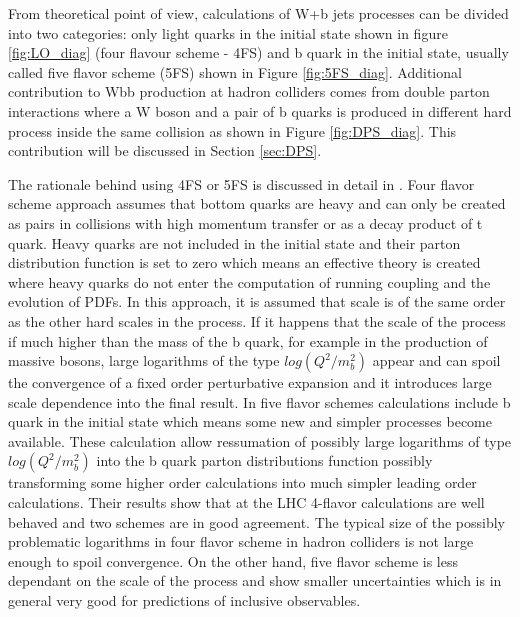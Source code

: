 From theoretical point of view, calculations of W+b jets processes can be divided into two categories: only light quarks in the initial state shown in figure \ref{fig:LO_diag} (four flavour scheme - 4FS) and b quark in the initial state, usually called five flavor scheme (5FS) shown in Figure \ref{fig:5FS_diag}. Additional contribution to Wbb production at hadron colliders comes from double parton interactions where a W boson and a pair of b quarks is produced in different hard process inside the same collision as shown in Figure \ref{fig:DPS_diag}. This contribution will be discussed in Section \ref{sec:DPS}.

\par The rationale behind using 4FS or 5FS is discussed in detail in \cite{Maltoni:2012pa}. Four flavor scheme approach assumes that bottom quarks are heavy and can only be created as pairs in collisions with high momentum transfer or as a decay product of t quark. Heavy quarks are not included in the initial state and their parton distribution function is set to zero which means an effective theory is created where heavy quarks do not enter the computation of running coupling and the evolution of PDFs. In this approach, it is assumed that scale is of the same order as the other hard scales in the process. If it happens that the scale of the process if much higher than the mass of the b quark, for example in the production of massive bosons, large logarithms of the type $log(Q^2/m_b^2)$ appear and can spoil the convergence of a fixed order perturbative expansion and it introduces large scale dependence into the final result. In five flavor schemes calculations include b quark in the initial state which means some new and simpler processes become available. These calculation allow ressumation of possibly large logarithms of type $log(Q^2/m_b^2)$ into the b quark parton distributions function possibly transforming some higher order calculations into much simpler leading order calculations.  
Their results show that at the LHC 4-flavor calculations are well behaved and two schemes are in good agreement. The typical size of the possibly problematic logarithms in four flavor scheme in hadron colliders is not large enough to spoil convergence. On the other hand, five flavor scheme is less dependant on the scale of the process and show smaller uncertainties which is in general very good for predictions of inclusive observables.  


